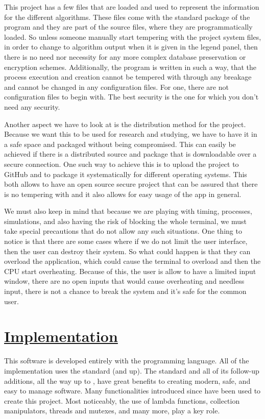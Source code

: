\documentclass{article}
\newcommand{\code}[1]{\codeinline{\texttt{#1}}}
\begin{document}
This project has a few files that are loaded and used to represent the information for the different algorithms. These files come with the standard package of the program and they are part of the source files, where they are programmatically loaded. So unless someone manually start tempering with the project system files, in order to change to algorithm output when it is given in the legend panel, then there is no need nor necessity for any more complex database preservation or encryption schemes. Additionally, the program is written in such a way, that the process execution and creation cannot be tempered with through any breakage and cannot be changed in any configuration files. For one, there are not configuration files to begin with. The best security is the one for which you don't need any security.

Another aspect we have to look at is the distribution method for the project. Because we want this to be used for research and studying, we have to have it in a safe space and packaged without being compromised. This can easily be achieved if there is a distributed source and package that is downloadable over a secure connection. One such way to achieve this is to upload the project to GitHub and to package it systematically for different operating systems. This both allows to have an open source secure project that can be assured that there is no tempering with and it also allows for easy usage of the app in general.

We must also keep in mind that because we are playing with timing, processes, simulations, and also having the risk of blocking the whole terminal, we must take special precautions that do not allow any such situations. One thing to notice is that there are some cases where if we do not limit the user interface, then the user can destroy their system. So what could happen is that they can overload the application, which could cause the terminal to overload and then the CPU start overheating. Because of this, the user is allow to have a limited input window, there are no open inputs that would cause overheating and needless input, there is not a chance to break the system and it's safe for the common user.

\section{\underline{Implementation}}

This software is developed entirely with the \code{C++} programming language. All of the implementation uses the \code{C++ 11} standard (and up). The \code{C++ 11} standard and all of its follow-up additions, all the way up to \code{C++ 20}, have great benefits to creating modern, safe, and easy to manage software. Many functionalities introduced since \code{C++ 11} have been used to create this project. Most noticeably, the use of lambda functions, collection manipulators, threads and mutexes, and many more, play a key role.
\end{document}
